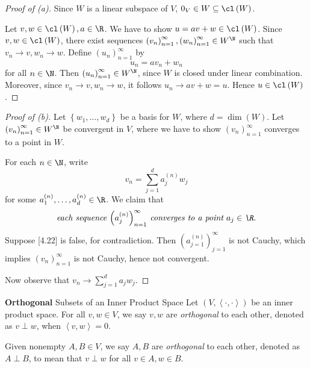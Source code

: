 \documentclass[pmath450]{subfiles}
\begin{document}
    \begin{proof}[Proof of (a)]
        Since $W$ is a linear subspace of $V$, $0_V\in W\subseteq\cl\left( W \right)$.

        Let $v,w\in\cl\left( W \right),a\in\R$. We have to show $u=av+w\in\cl\left( W \right)$. Since $v,w\in\cl\left( W \right)$, there exist sequences $\left( v_{n} \right)^{\infty}_{n=1},\left( w_{n} \right)^{\infty}_{n=1}\in W^{\N}$ such that $v_n\to v, w_n\to w$. Define $\left( u_{n} \right)^{\infty}_{n=1}$ by
        \begin{equation*}
            u_n = av_n+w_n
        \end{equation*}
        for all $n\in\N$. Then $\left( u_{n} \right)^{\infty}_{n=1}\in W^{\N}$, since $W$ is closed under linear combination. Moreover, since $v_n\to v, w_n\to w$, it follows $u_n\to av+w=u$. Hence $u\in\cl\left( W \right)$.
        \qedplacedtrue
    \end{proof}

    \begin{proof}[Proof of (b)]
        Let $\left\lbrace w_1,\ldots,w_d \right\rbrace$ be a basis for $W$, where $d=\dim\left( W \right)$. Let $\left( v_{n} \right)^{\infty}_{n=1}\in W^{\N}$ be convergent in $V$, where we have to show $\left( v_{n} \right)^{\infty}_{n=1}$ converges to a point in $W$. 

        For each $n\in\N$, write
        \begin{equation*}
            v_n = \sum^{d}_{j=1} a^{\left( n \right)}_jw_j
        \end{equation*}
        for some $a^{\left( n \right)}_1,\ldots,a^{\left( n \right)}_d\in\R$. We claim that
        \begin{equation}
            \text{\textit{each sequence $\left( a^{\left( n \right)}_{j} \right)^{\infty}_{n=1}$ converges to a point $a_j\in\R$.}}
        \end{equation}
        Suppose [4.22] is false, for contradiction. Then $\left( a^{\left( n \right)}_{j=1} \right)^{\infty}_{j=1}$ is not Cauchy, which implies $\left( v_{n} \right)^{\infty}_{n=1}$ is not Cauchy, hence not convergent. 

        Now observe that $v_n\to \sum^{d}_{j=1}a_jw_j$.
    \end{proof}
    
    \begin{definition}{\textbf{Orthogonal} Subsets of an Inner Product Space}
        Let $\left( V,\left\langle \cdot, \cdot\right\rangle \right)$ be an inner product space. For all $v,w\in V$, we say $v,w$ are \textit{orthogonal} to each other, denoted as $v\perp w$, when $\left\langle v, w\right\rangle=0$.

        Given nonempty $A,B\in V$, we say $A,B$ are \textit{orthogonal} to each other, denoted as $A\perp B$, to mean that $v\perp w$ for all $v\in A, w\in B$.
    \end{definition}
    
\end{document}

